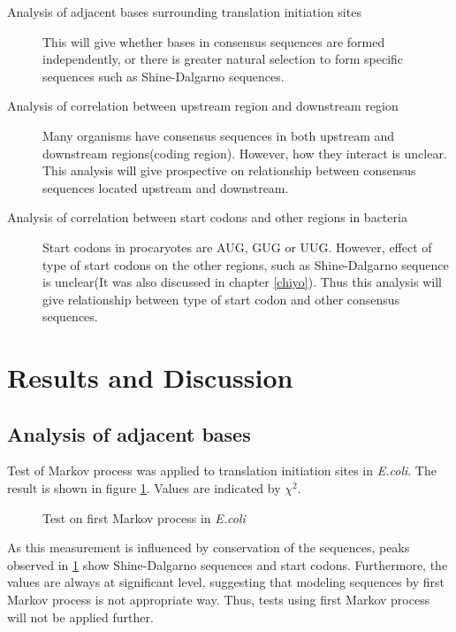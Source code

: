 \begin{description}
\item[Analysis of adjacent bases surrounding translation initiation
sites] This will give whether bases in consensus sequences are formed
independently, or there is greater natural selection to form specific
sequences such as Shine-Dalgarno sequences.
\item[Analysis of correlation between upstream region and downstream
region] Many organisms have consensus sequences in both upstream and
downstream regions(coding region). However, how they interact is unclear.
This analysis will give prospective on relationship between consensus
sequences located upstream and downstream.
\item[Analysis of correlation between start codons and other regions in
bacteria] Start codons in procaryotes are AUG, GUG or UUG. However,
effect of type of start codons on the other regions, such as
Shine-Dalgarno sequence is unclear(It was also discussed in chapter
\ref{chiyo}). Thus this analysis will give relationship between type of
start codon and other consensus sequences.
\end{description}

\section{Results and Discussion}


\subsection{Analysis of adjacent bases}
\label{adjacent_corr}

Test of Markov process was applied to translation initiation sites
in {\it E.coli}. The result is shown in figure \ref{ecmark}. Values are
indicated by \(\chi^{2}\).

\begin{figure}
\begin{center}
\end{center}
\caption{Test on first Markov process in {\it E.coli}}
\label{ecmark}
\end{figure}

As this measurement is influenced by conservation of the sequences,
peaks observed in \ref{ecmark} show Shine-Dalgarno sequences and start
codons. Furthermore, the values are always at significant level,
suggesting that modeling sequences by first Markov process is not
appropriate way. Thus, tests using first Markov process will not be
applied further.

